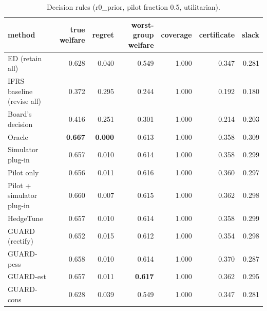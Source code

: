 \begin{table}[t]
\centering
\small
\begin{tabular}{lrrrrrr}
\toprule
method & true welfare & regret & worst-group welfare & coverage & certificate & slack \\
\midrule
ED (retain all) & 0.628 & 0.040 & 0.549 & 1.000 & 0.347 & 0.281 \\
IFRS baseline (revise all) & 0.372 & 0.295 & 0.244 & 1.000 & 0.192 & 0.180 \\
Board's decision & 0.416 & 0.251 & 0.301 & 1.000 & 0.214 & 0.203 \\
Oracle & \textbf{0.667} & \textbf{0.000} & 0.613 & 1.000 & 0.358 & 0.309 \\
Simulator plug-in & 0.657 & 0.010 & 0.614 & 1.000 & 0.358 & 0.299 \\
Pilot only & 0.656 & 0.011 & 0.616 & 1.000 & 0.360 & 0.297 \\
Pilot + simulator plug-in & 0.660 & 0.007 & 0.615 & 1.000 & 0.362 & 0.298 \\
HedgeTune & 0.657 & 0.010 & 0.614 & 1.000 & 0.358 & 0.299 \\
GUARD (rectify) & 0.652 & 0.015 & 0.612 & 1.000 & 0.354 & 0.298 \\
GUARD-pess & 0.658 & 0.010 & 0.614 & 1.000 & 0.370 & 0.287 \\
GUARD-est & 0.657 & 0.011 & \textbf{0.617} & 1.000 & 0.362 & 0.295 \\
GUARD-cons & 0.628 & 0.039 & 0.549 & 1.000 & 0.347 & 0.281 \\
\bottomrule
\end{tabular}
\caption{Decision rules (r0\_prior, pilot fraction 0.5, utilitarian).}
\label{tab:methods-utilitarian}
\end{table}
